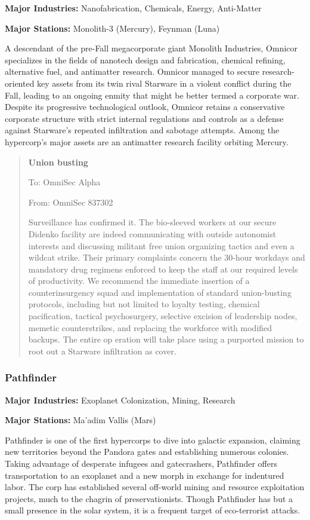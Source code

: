 \textbf{Major Industries:} Nanofabrication, Chemicals, Energy, Anti-Matter 

\textbf{Major Stations:} Monolith-3 (Mercury), Feynman (Luna) 

 A descendant of the pre-Fall megacorporate giant Monolith Industries, Omnicor specializes in the fields of nanotech design and fabrication, chemical refining, alternative fuel, and antimatter research. Omnicor managed to secure research-oriented key assets from its twin rival Starware in a violent conflict during the Fall, leading to an ongoing enmity that might be better termed a corporate war. Despite its progressive technological outlook, Omnicor retains a conservative corporate structure with strict internal regulations and controls as a defense against Starware's repeated infiltration and sabotage attempts. Among the hypercorp's major assets are an antimatter research facility orbiting Mercury. 

\begin{quotation}
\textbf{Union busting} 

To: OmniSec Alpha 

From: OmniSec 837302 

Surveillance has confirmed it. The bio-sleeved workers at our secure Didenko facility are indeed communicating with outside autonomist interests and discussing militant free union organizing tactics and even a wildcat strike. Their primary complaints concern the 30-hour workdays and mandatory drug regimens enforced to keep the staff at our required levels of productivity. We recommend the immediate insertion of a counterinsurgency squad and implementation of standard union-busting protocols, including but not limited to loyalty testing, chemical pacification, tactical psychosurgery, selective excision of leadership nodes, memetic counterstrikes, and replacing the workforce with modified backups. The entire op eration will take place using a purported mission to root out a Starware infiltration as cover.
\end{quotation} 

\subsubsection{Pathfinder}
\label{sec:pathfinder} 

\textbf{Major Industries:} Exoplanet Colonization, Mining, Research 

\textbf{Major Stations:} Ma'adim Vallis (Mars) 

 Pathfinder is one of the first hypercorps to dive into galactic expansion, claiming new territories beyond the Pandora gates and establishing numerous colonies. Taking advantage of desperate infugees and gatecrashers, Pathfinder offers transportation to an exoplanet and a new morph in exchange for indentured labor. The corp has established several off-world mining and resource exploitation projects, much to the chagrin of preservationists. Though Pathfinder has but a small presence in the solar system, it is a frequent target of eco-terrorist attacks. 

